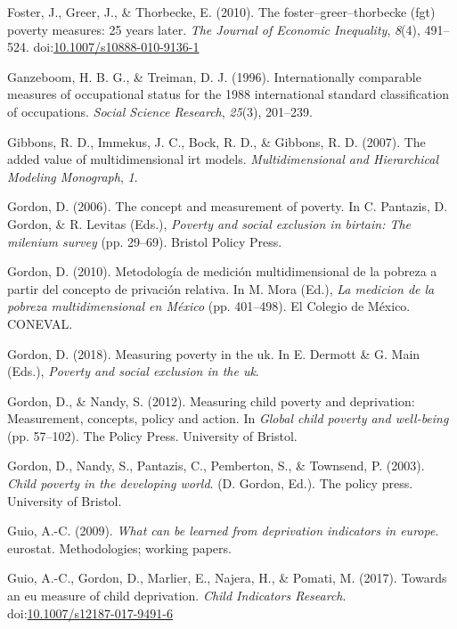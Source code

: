 \documentclass[]{book}
\begin{document}
\leavevmode\hypertarget{ref-Foster2010a}{}%
Foster, J., Greer, J., \& Thorbecke, E. (2010). The foster--greer--thorbecke (fgt) poverty measures: 25 years later. \emph{The Journal of Economic Inequality}, \emph{8}(4), 491--524. doi:\href{https://doi.org/10.1007/s10888-010-9136-1}{10.1007/s10888-010-9136-1}

\leavevmode\hypertarget{ref-Ganzeboom1996}{}%
Ganzeboom, H. B. G., \& Treiman, D. J. (1996). Internationally comparable measures of occupational status for the 1988 international standard classification of occupations. \emph{Social Science Research}, \emph{25}(3), 201--239.

\leavevmode\hypertarget{ref-Gibbons2007}{}%
Gibbons, R. D., Immekus, J. C., Bock, R. D., \& Gibbons, R. D. (2007). The added value of multidimensional irt models. \emph{Multidimensional and Hierarchical Modeling Monograph}, \emph{1}.

\leavevmode\hypertarget{ref-Gordon2006}{}%
Gordon, D. (2006). The concept and measurement of poverty. In C. Pantazis, D. Gordon, \& R. Levitas (Eds.), \emph{Poverty and social exclusion in birtain: The milenium survey} (pp. 29--69). Bristol Policy Press.

\leavevmode\hypertarget{ref-Gordon2010}{}%
Gordon, D. (2010). Metodología de medición multidimensional de la pobreza a partir del concepto de privación relativa. In M. Mora (Ed.), \emph{La medicion de la pobreza multidimensional en México} (pp. 401--498). El Colegio de México. CONEVAL.

\leavevmode\hypertarget{ref-Gordon2018}{}%
Gordon, D. (2018). Measuring poverty in the uk. In E. Dermott \& G. Main (Eds.), \emph{Poverty and social exclusion in the uk}.

\leavevmode\hypertarget{ref-Gordon2012}{}%
Gordon, D., \& Nandy, S. (2012). Measuring child poverty and deprivation: Measurement, concepts, policy and action. In \emph{Global child poverty and well-being} (pp. 57--102). The Policy Press. University of Bristol.

\leavevmode\hypertarget{ref-Gordon2003}{}%
Gordon, D., Nandy, S., Pantazis, C., Pemberton, S., \& Townsend, P. (2003). \emph{Child poverty in the developing world}. (D. Gordon, Ed.). The policy press. University of Bristol.

\leavevmode\hypertarget{ref-Guio2009a}{}%
Guio, A.-C. (2009). \emph{What can be learned from deprivation indicators in europe}. eurostat. Methodologies; working papers.

\leavevmode\hypertarget{ref-Guio2017}{}%
Guio, A.-C., Gordon, D., Marlier, E., Najera, H., \& Pomati, M. (2017). Towards an eu measure of child deprivation. \emph{Child Indicators Research}. doi:\href{https://doi.org/10.1007/s12187-017-9491-6}{10.1007/s12187-017-9491-6}
\end{document}
